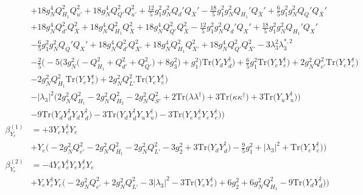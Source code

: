 {\begin{align}
 &+18 g_{N}^{4} Q_{H_1}^{2} Q_{u'}^{2} +18 g_{N}^{4} Q_{Q'}^{2} Q_{u'}^{2} +\frac{12}{5} g_{1}^{2} g_{N}^{2} Q_d' Q_{\bar{X}}' -\frac{18}{5} g_{1}^{2} g_{N}^{2} Q_{H_1}' Q_{\bar{X}}' +\frac{6}{5} g_{1}^{2} g_{N}^{2} Q_Q' Q_{\bar{X}}' \nonumber \\ 
 &+18 g_{N}^{4} Q_{d'}^{2} Q_{\bar{X}}^{2} +18 g_{N}^{4} Q_{H_1}^{2} Q_{\bar{X}}^{2} +18 g_{N}^{4} Q_{Q'}^{2} Q_{\bar{X}}^{2} -\frac{12}{5} g_{1}^{2} g_{N}^{2} Q_d' Q_X' +\frac{18}{5} g_{1}^{2} g_{N}^{2} Q_{H_1}' Q_X' \nonumber \\ 
 &-\frac{6}{5} g_{1}^{2} g_{N}^{2} Q_Q' Q_X' +18 g_{N}^{4} Q_{d'}^{2} Q_{X'}^{2} +18 g_{N}^{4} Q_{H_1}^{2} Q_{X'}^{2} +18 g_{N}^{4} Q_{Q'}^{2} Q_{X'}^{2} -3 \lambda_{3}^{2} \lambda_{3}^{*,2} \nonumber \\ 
 &-\frac{2}{5} \Big(-5 \Big(3 g_{N}^{2} \Big(- Q_{H_1}^{2}  + Q_{d'}^{2} + Q_{Q'}^{2}\Big) + 8 g_{3}^{2} \Big) + g_{1}^{2}\Big)\mbox{Tr}\Big({Y_d  Y_{d}^{\dagger}}\Big) +\frac{6}{5} g_{1}^{2} \mbox{Tr}\Big({Y_e  Y_{e}^{\dagger}}\Big) +2 g_{N}^{2} Q_{e'}^{2} \mbox{Tr}\Big({Y_e  Y_{e}^{\dagger}}\Big) \nonumber \\ 
 &-2 g_{N}^{2} Q_{H_1}^{2} \mbox{Tr}\Big({Y_e  Y_{e}^{\dagger}}\Big) +2 g_{N}^{2} Q_{L'}^{2} \mbox{Tr}\Big({Y_e  Y_{e}^{\dagger}}\Big) \nonumber \\ 
 &- |\lambda_3|^2 \Big(2 g_{N}^{2} Q_{H_1}^{2}  -2 g_{N}^{2} Q_{H_2}^{2}  -2 g_{N}^{2} Q_{S'}^{2}  + 2 \mbox{Tr}\Big({\lambda  \lambda^{\dagger}}\Big)  + 3 \mbox{Tr}\Big({\kappa  \kappa^{\dagger}}\Big)  + 3 \mbox{Tr}\Big({Y_u  Y_{u}^{\dagger}}\Big) \Big)\nonumber \\ 
 &-9 \mbox{Tr}\Big({Y_d  Y_{d}^{\dagger}  Y_d  Y_{d}^{\dagger}}\Big) -3 \mbox{Tr}\Big({Y_d  Y_{d}^{\dagger}  Y_u  Y_{u}^{\dagger}}\Big) -3 \mbox{Tr}\Big({Y_e  Y_{e}^{\dagger}  Y_e  Y_{e}^{\dagger}}\Big) \Big)\\ 
\beta_{Y_e}^{(1)} & =  
+3 {Y_e  Y_{e}^{\dagger}  Y_e} \nonumber \\ 
 &+Y_e \Big(-2 g_{N}^{2} Q_{e'}^{2}  -2 g_{N}^{2} Q_{H_1}^{2}  -2 g_{N}^{2} Q_{L'}^{2}  -3 g_{2}^{2}  + 3 \mbox{Tr}\Big({Y_d  Y_{d}^{\dagger}}\Big)  -\frac{9}{5} g_{1}^{2}  + |\lambda_3|^2 + \mbox{Tr}\Big({Y_e  Y_{e}^{\dagger}}\Big)\Big)\\ 
\beta_{Y_e}^{(2)} & =  
-4 {Y_e  Y_{e}^{\dagger}  Y_e  Y_{e}^{\dagger}  Y_e} \nonumber \\ 
 &+{Y_e  Y_{e}^{\dagger}  Y_e} \Big(-2 g_{N}^{2} Q_{e'}^{2}  + 2 g_{N}^{2} Q_{L'}^{2}  -3 |\lambda_3|^2  -3 \mbox{Tr}\Big({Y_e  Y_{e}^{\dagger}}\Big)  + 6 g_{2}^{2}  + 6 g_{N}^{2} Q_{H_1}^{2}  -9 \mbox{Tr}\Big({Y_d  Y_{d}^{\dagger}}\Big) \Big)\nonumber \\ 

\end{align}}
